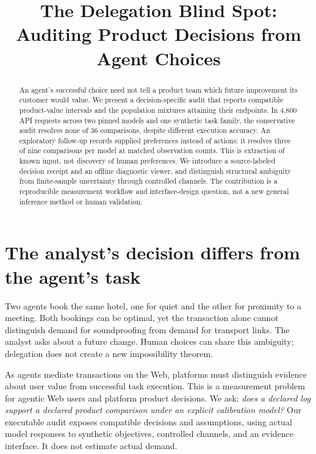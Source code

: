 \documentclass[sigconf,review,anonymous]{acmart}
\title{The Delegation Blind Spot: Auditing Product Decisions from Agent Choices}
\begin{document}
\begin{abstract}
An agent's successful choice need not tell a product team which future improvement its customer would value. We present a decision-specific audit that reports compatible product-value intervals and the population mixtures attaining their endpoints. In 4,800 API requests across two pinned models and one synthetic task family, the conservative audit resolves none of 36 comparisons, despite different execution accuracy. An exploratory follow-up records supplied preferences instead of actions: it resolves three of nine comparisons per model at matched observation counts. This is extraction of known input, not discovery of human preferences. We introduce a source-labeled decision receipt and an offline diagnostic viewer, and distinguish structural ambiguity from finite-sample uncertainty through controlled channels. The contribution is a reproducible measurement workflow and interface-design question, not a new general inference method or human validation.
\end{abstract}
\maketitle

\section{The analyst's decision differs from the agent's task}
Two agents book the same hotel, one for quiet and the other for proximity to a meeting. Both bookings can be optimal, yet the transaction alone cannot distinguish demand for soundproofing from demand for transport links. The analyst asks about a future change. Human choices can share this ambiguity; delegation does not create a new impossibility theorem.

As agents mediate transactions on the Web, platforms must distinguish evidence about user value from successful task execution. This is a measurement problem for agentic Web users and platform product decisions. We ask: \emph{does a declared log support a declared product comparison under an explicit calibration model?} Our executable audit exposes compatible decisions and assumptions, using actual model responses to synthetic objectives, controlled channels, and an evidence interface. It does not estimate actual demand.
\end{document}
